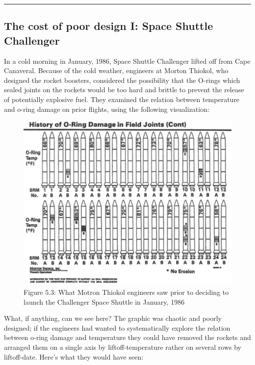 \documentclass[
  openany]{book}
\begin{document}
\begin{center}\rule{0.5\linewidth}{\linethickness}\end{center}

\hypertarget{the-cost-of-poor-design-i-space-shuttle-challenger}{%
\subsection{The cost of poor design I: Space Shuttle Challenger}\label{the-cost-of-poor-design-i-space-shuttle-challenger}}

In a cold morning in January, 1986, Space Shuttle Challenger lifted off from Cape Canaveral. Because of the cold weather, engineers at Morton Thiokol, who designed the rocket boosters, considered the possibility that the O-rings which sealed joints on the rockets would be too hard and brittle to prevent the release of potentially explosive fuel. They examined the relation between temperature and o-ring damage on prior flights, using the following visualization:

\begin{figure}
\centering
\includegraphics{mortonthiokolChallenger.PNG}
\caption{Figure 5.3: What Motron Thiokol engineers saw prior to deciding to launch the Challenger Space Shuttle in January, 1986}
\end{figure}

What, if anything, can we see here? The graphic was chaotic and poorly designed; if the engineers had wanted to systematically explore the relation between o-ring damage and temperature they could have removed the rockets and arranged them on a single axis by liftoff-temperature rather on several rows by liftoff-date. Here's what they would have seen:
\end{document}
